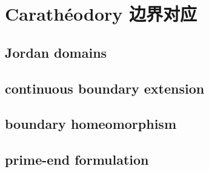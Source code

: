\section{Carathéodory 边界对应}
\label{b3:sec:0702}


\subsection{Jordan domains}
\label{b3:subsec:070201}

\subsection{continuous boundary extension}
\label{b3:subsec:070202}

\subsection{boundary homeomorphism}
\label{b3:subsec:070203}

\subsection{prime-end formulation}
\label{b3:subsec:070204}


